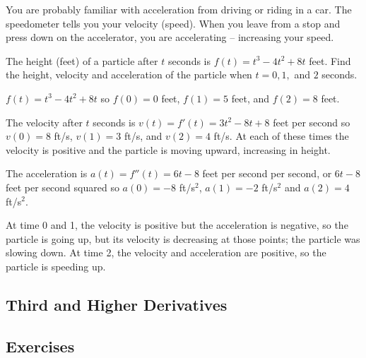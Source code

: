 You are probably familiar with acceleration from driving or riding in a car. The speedometer tells you your velocity (speed). When you leave from a stop and press down on the accelerator, you are accelerating -- increasing your speed.

\begin{example}
The height (feet) of a particle after $t$ seconds is $f(t)=t^3-4t^2+8t$ feet. Find the height, velocity and acceleration of the particle when $t= 0, 1,$ and $2$ seconds.

\begin{solution} $f(t)=t^3-4t^2+8t$ so $f(0)=0$ feet, $f(1)=5$ feet, and $f(2)=8$ feet.

The velocity after $t$ seconds is $v(t)=f'(t)=3t^2-8t+8$ feet per second so $v(0)=8$ ft/s, $v(1)=3$ ft/s, and $v(2)=4$ ft/s. At each of these times the velocity is positive and the particle is moving upward, increasing in height.

The acceleration is $a(t)=f''(t)=6t-8$ feet per second per second, or $6t-8$ feet per second squared so $a(0)=-8$ ft/s$^2$, $a(1)=-2$ ft/s$^2$ and $a(2)=4$ ft/s$^2$.

At time 0 and 1, the velocity is positive but the acceleration is negative, so the particle is going up, but its velocity is decreasing at those points; the particle was slowing down. At time 2, the velocity and acceleration are positive, so the particle is speeding up.
\end{solution}\end{example}


\subsection{Third and Higher Derivatives}

\subsection{Exercises}
